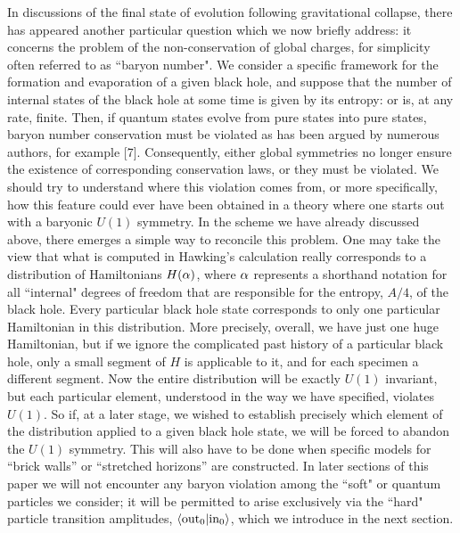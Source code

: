 In discussions of the final state of evolution following gravitational
collapse, there has appeared another particular question which we now
briefly address:  it concerns the problem of the non-conservation of
global charges, for simplicity often referred to as ``baryon number".
We consider a specific framework for the formation and evaporation of a
given black hole, and suppose that the number of internal states of the
black hole at some time is given by its entropy:  or is, at any rate,
finite. Then, if quantum states evolve from pure states into pure
states, baryon number conservation must be violated as has been argued
by numerous authors, for example [7]. Consequently, either global
symmetries no longer ensure the existence of corresponding conservation
laws, or they must be violated. We should try to understand where this
violation comes from, or more specifically, how this feature could ever
have been obtained in a theory where one starts out with a baryonic
$U(1)$ symmetry.  In the scheme we have already discussed above, there
emerges a simple way to reconcile this problem. One may take the view
that what is computed in Hawking's calculation really corresponds to a
distribution of Hamiltonians $H(\alpha)$, where $\alpha$ represents a shorthand
notation for all ``internal" degrees of freedom that are responsible
for the entropy, $A/4$, of the black hole. Every particular black hole
state corresponds to only one particular Hamiltonian in this
distribution. More precisely, overall, we have just one huge
Hamiltonian, but if we ignore the complicated past history of a
particular black hole, only a small segment of $H$ is applicable to it,
and for each specimen a different segment. Now the entire distribution
will be exactly $U(1)$ invariant, but each particular element,
understood in the way we have specified, violates $U(1)$. So if, at a
later stage, we wished to establish precisely which element of the
distribution applied to a given black hole state, we will be forced to
abandon the $U(1)$ symmetry. This will also have to be done when
specific models for ``brick walls'' or ``stretched horizons'' are
constructed. In later sections of this paper we will not encounter any
baryon violation among the ``soft" or quantum particles we consider; it
will be permitted to arise exclusively via the ``hard" particle
transition amplitudes, $\langle\rm out_0|in_0\rangle$, which we
introduce in the next section.  \def\ss{\scriptscriptstyle}

